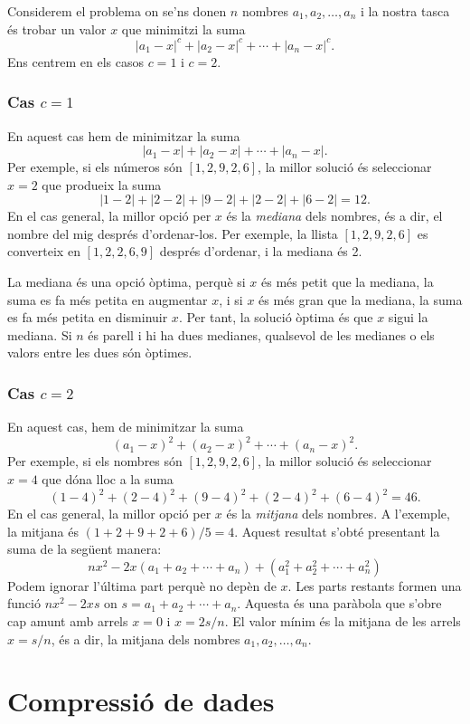 Considerem el problema on
se'ns donen $n$ nombres $a_1,a_2,\ldots,a_n$
i la nostra tasca és trobar un valor $x$
que minimitzi la suma
\[|a_1-x|^c+|a_2-x|^c+\cdots+|a_n-x|^c.\]
Ens centrem en els casos $c=1$ i $c=2$.

\subsubsection{Cas $c=1$}

En aquest cas hem de minimitzar la suma
\[|a_1-x|+|a_2-x|+\cdots+|a_n-x|.\]
Per exemple, si els números són $[1,2,9,2,6]$,
la millor solució és seleccionar $x=2$
que produeix la suma
\[
|1-2|+|2-2|+|9-2|+|2-2|+|6-2|=12.
\]
En el cas general, la millor opció per $x$
és la \textit{mediana} dels nombres,
és a dir, el nombre del mig després d'ordenar-los.
Per exemple, la llista $[1,2,9,2,6]$
es converteix en $[1,2,2,6,9]$ després d'ordenar,
i la mediana és 2.

La mediana és una opció òptima,
perquè si $x$ és més petit que la mediana,
la suma es fa més petita en augmentar $x$,
i si $x$ és més gran que la mediana,
la suma es fa més petita en disminuir $x$.
Per tant, la solució òptima és que $x$
sigui la mediana.
Si $n$ és parell i hi ha dues medianes,
qualsevol de les medianes o els valors entre les dues
són òptimes.

\subsubsection{Cas $c=2$}

En aquest cas, hem de minimitzar la suma
\[(a_1-x)^2+(a_2-x)^2+\cdots+(a_n-x)^2.\]
Per exemple, si els nombres són $[1,2,9,2,6]$,
la millor solució és seleccionar $x=4$
que dóna lloc a la suma
\[
(1-4)^2+(2-4)^2+(9-4)^2+(2-4)^2+(6-4)^2=46.
\]
En el cas general, la millor opció per $x$
és la \emph{mitjana} dels nombres.
A l'exemple, la mitjana és $(1+2+9+2+6)/5=4$.
Aquest resultat s'obté presentant
la suma de la següent manera:
\[
nx^2 - 2x(a_1+a_2+\cdots+a_n) + (a_1^2+a_2^2+\cdots+a_n^2)
\]
Podem ignorar l'última part perquè no depèn de $x$.
Les parts restants formen una funció
$nx^2-2xs$ on $s=a_1+a_2+\cdots+a_n$.
Aquesta és una paràbola que s'obre cap amunt
amb arrels $x=0$ i $x=2s/n$. El valor mínim
és la mitjana de les arrels $x=s/n$, és a dir,
la mitjana dels nombres $a_1,a_2,\ldots,a_n$.

\section{Compressió de dades}

